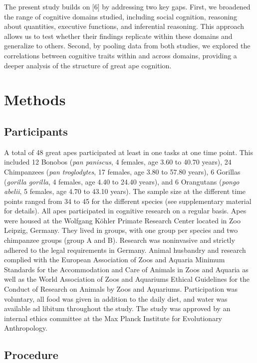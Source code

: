 \documentclass[
  man,floatsintext]{apa6}
\begin{document}
The present study builds on {[}6{]} by addressing two key gaps. First, we broadened the range of cognitive domains studied, including social cognition, reasoning about quantities, executive functions, and inferential reasoning. This approach allows us to test whether their findings replicate within these domains and generalize to others. Second, by pooling data from both studies, we explored the correlations between cognitive traits within and across domains, providing a deeper analysis of the structure of great ape cognition.

\section{Methods}\label{methods}

\subsection{Participants}\label{participants}

A total of 48 great apes participated at least in one tasks at one time point. This included 12 Bonobos (\emph{pan paniscus}, 4 females, age 3.60 to 40.70 years), 24 Chimpanzees (\emph{pan troglodytes}, 17 females, age 3.80 to 57.80 years), 6 Gorillas (\emph{gorilla gorilla}, 4 females, age 4.40 to 24.40 years), and 6 Orangutans (\emph{pongo abelii}, 5 females, age 4.70 to 43.10 years). The sample size at the different time points ranged from 34 to 45 for the different species (see supplementary material for details). All apes participated in cognitive research on a regular basis. Apes were housed at the Wolfgang Köhler Primate Research Center located in Zoo Leipzig, Germany. They lived in groups, with one group per species and two chimpanzee groups (group A and B). Research was noninvasive and strictly adhered to the legal requirements in Germany. Animal husbandry and research complied with the European Association of Zoos and Aquaria Minimum Standards for the Accommodation and Care of Animals in Zoos and Aquaria as well as the World Association of Zoos and Aquariums Ethical Guidelines for the Conduct of Research on Animals by Zoos and Aquariums. Participation was voluntary, all food was given in addition to the daily diet, and water was available ad libitum throughout the study. The study was approved by an internal ethics committee at the Max Planck Institute for Evolutionary Anthropology.

\subsection{Procedure}\label{procedure}
\end{document}
